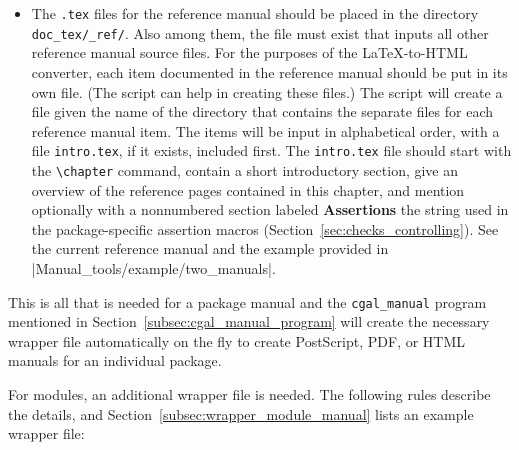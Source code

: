 \begin{itemize}
   \item The {\tt .tex} files for the reference manual should be placed in the 
         directory \verb|doc_tex/|\verb|_ref/|.
         Also among them, the file 
          must exist that inputs all other reference
         manual source files.
         For the purposes of the \LaTeX -to-HTML converter, each item 
         documented in the reference manual should be put in its own file. 
         (The script  can help
          in creating these files.)
         The script  
         will create a 
         file given the name of the directory that contains the separate files 
         for each
         reference manual item.  The items will be input in alphabetical order,
         with a file {\tt intro.tex}, if it 
         exists, included first.  The
         {{\tt intro.tex}} file should start with the \verb|\chapter| command,
         contain a short introductory section, give an overview of the
         reference pages contained in this chapter, and mention
         optionally with a nonnumbered section labeled \textbf{Assertions} 
         the string used in the package-specific assertion macros 
         (Section~\ref{sec:checks_controlling}).  See the current reference
         manual and the example provided in
         \nonlinkedpath|Manual_tools/example/two_manuals|. 
\end{itemize}

This is all that is needed for a package manual and the
\texttt{cgal\_manual} program mentioned in
Section~\ref{subsec:cgal_manual_program} will create the necessary
wrapper file automatically on the fly to create PostScript, PDF, or
HTML manuals for an individual package.

For modules, an additional wrapper file is needed. The following rules
describe the details, and Section~\ref{subsec:wrapper_module_manual}
lists an example wrapper file:

